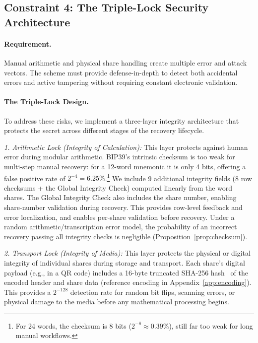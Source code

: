 \documentclass[11pt]{article}
\begin{document}
\subsection{Constraint 4: The Triple-Lock Security Architecture}
\label{sec:triple-lock}

\paragraph{Requirement.} Manual arithmetic and physical share handling create multiple error and attack vectors. The scheme must provide defense-in-depth to detect both accidental errors and active tampering without requiring constant electronic validation.

\paragraph{The Triple-Lock Design.} To address these risks, we implement a three-layer integrity architecture that protects the secret across different stages of the recovery lifecycle.

\textit{1. Arithmetic Lock (Integrity of Calculation):} This layer protects against human error during modular arithmetic. BIP39's intrinsic checksum is too weak for multi-step manual recovery: for a 12-word mnemonic it is only 4 bits, offering a false positive rate of $2^{-4} = 6.25\%$.\footnote{For 24 words, the checksum is 8 bits ($2^{-8} \approx 0.39\%$), still far too weak for long manual workflows.} We include 9 additional integrity fields (8 row checksums + the Global Integrity Check) computed linearly from the word shares. The Global Integrity Check also includes the share number, enabling share-number validation during recovery. This provides row-level feedback and error localization, and enables per-share validation before recovery. Under a random arithmetic/transcription error model, the probability of an incorrect recovery passing all integrity checks is negligible (Proposition~\ref{prop:checksum}).

\textit{2. Transport Lock (Integrity of Media):} This layer protects the physical or digital integrity of individual shares during storage and transport. Each share's digital payload (e.g., in a QR code) includes a 16-byte truncated SHA-256 hash~\cite{fips1804} of the encoded header and share data (reference encoding in Appendix~\ref{app:encoding}). This provides a $2^{-128}$ detection rate for random bit flips, scanning errors, or physical damage to the media before any mathematical processing begins.
\end{document}
